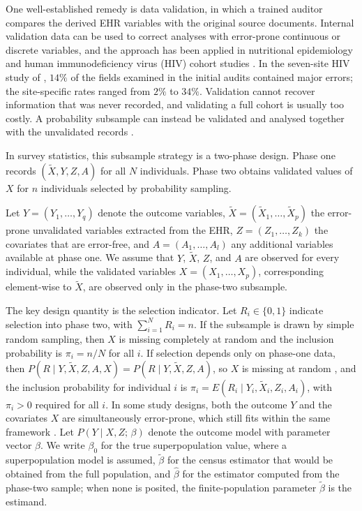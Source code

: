One well-established remedy is data validation, in which a trained auditor compares the derived EHR variables with the original source documents. Internal validation data can be used to correct analyses with error-prone continuous or discrete variables, and the approach has been applied in nutritional epidemiology and human immunodeficiency virus (HIV) cohort studies \citep{rosner1990correction, spiegelman1997fully, thurston2005comparison, lyles2011validation, shepherd2023multiwave}. In the seven-site HIV study of \citet{duda2012measuring}, $14\%$ of the fields examined in the initial audits contained major errors; the site-specific rates ranged from $2\%$ to $34\%$. Validation cannot recover information that was never recorded, and validating a full cohort is usually too costly. A probability subsample can instead be validated and analysed together with the unvalidated records \citep{huang2018pie, giganti2020accounting}.

In survey statistics, this subsample strategy is a two-phase design. Phase one records $(\tilde{X},Y,Z,A)$ for all $N$ individuals. Phase two obtains validated values of $X$ for $n$ individuals selected by probability sampling.

Let $Y = (Y_1, \ldots, Y_q)$ denote the outcome variables, $\tilde{X} = (\tilde{X}_1, \ldots, \tilde{X}_p)$ the error-prone unvalidated variables extracted from the EHR, $Z = (Z_1, \ldots, Z_k)$ the covariates that are error-free, and $A = (A_1, \ldots, A_l)$ any additional variables available at phase one. We assume that $Y$, $\tilde{X}$, $Z$, and $A$ are observed for every individual, while the validated variables $X = (X_1, \ldots, X_p)$, corresponding element-wise to $\tilde{X}$, are observed only in the phase-two subsample.

The key design quantity is the selection indicator. Let $R_i \in \{0,1\}$ indicate selection into phase two, with $\sum_{i=1}^{N} R_i = n$. If the subsample is drawn by simple random sampling, then $X$ is missing completely at random and the inclusion probability is $\pi_i = n/N$ for all $i$. If selection depends only on phase-one data, then $P(R \mid Y, \tilde{X}, Z, A, X) = P(R \mid Y, \tilde{X}, Z, A)$, so $X$ is missing at random \citep{rubin1976inference}, and the inclusion probability for individual $i$ is $\pi_i = E(R_i \mid Y_i, \tilde{X}_i, Z_i, A_i)$, with $\pi_i > 0$ required for all $i$. In some study designs, both the outcome $Y$ and the covariates $X$ are simultaneously error-prone, which still fits within the same framework \citep{giganti2020accounting}. Let $P(Y \mid X, Z;\, \beta)$ denote the outcome model with parameter vector $\beta$. We write $\beta_0$ for the true superpopulation value, where a superpopulation model is assumed, $\tilde{\beta}$ for the census estimator that would be obtained from the full population, and $\hat{\beta}$ for the estimator computed from the phase-two sample; when none is posited, the finite-population parameter $\tilde{\beta}$ is the estimand.

